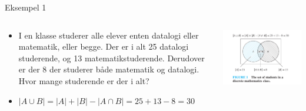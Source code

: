 \documentclass{beamer}
\begin{document}
\begin{frame}{Eksempel 1}
\begin{columns}
\begin{column}{0.5 \textwidth}
   \begin{itemize}
       \item<1-> I en klasse studerer alle elever enten datalogi eller matematik, eller begge. Der er i alt 25 datalogi studerende, og 13 matematikstuderende. Derudover er der 8 der studerer både matematik og datalogi. Hvor mange studerende er der i alt? 
       \item<2-> $|A \cup B| = |A| + |B| - |A \cap B| = 25 + 13 - 8 = 30$
   \end{itemize} 
\end{column}
\begin{column}{0.5 \textwidth}
\pause
   \includegraphics[scale=0.36]{81fig1.png} 
\end{column}
\end{columns}
\end{frame}
\end{document}
